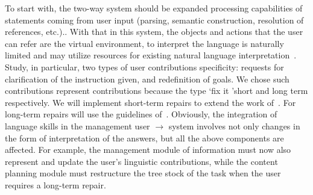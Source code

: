 To start with, the two-way system should be expanded processing capabilities of
statements coming from user input (parsing, semantic construction, resolution of
references, etc.).. With that in this system, the objects and actions that the
user can refer are the virtual environment, to interpret the language is
naturally limited and may utilize resources for existing natural language
interpretation~\cite{kow06}. Study, in particular, two types of user
contributions specificity:
requests for clarification of the instruction given, and redefinition of goals.
We chose such contributions represent contributions because the type `fix it
'short and long term respectively. We will implement short-term repairs to
extend the work of~\cite{purver06}. For long-term repairs will use the
guidelines of~\cite{blaylock05a,blaylock05b}. Obviously, the integration
of
language skills in the management user $\to$ system involves not only changes
in the form of interpretation of the answers, but all the above components are
affected. For example, the management module of information must now also
represent and update the user's linguistic contributions, while the content
planning module must restructure the tree stock of the task when the user
requires a long-term repair. 
\medskip


